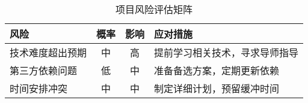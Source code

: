 \begin{table}[H]
\centering
\begin{tabular}{|p{4cm}|c|c|p{5cm}|}
\hline
\textbf{风险} & \textbf{概率} & \textbf{影响} & \textbf{应对措施} \\
\hline
技术难度超出预期 & 中 & 高 & 提前学习相关技术，寻求导师指导 \\
\hline
第三方依赖问题 & 低 & 中 & 准备备选方案，定期更新依赖 \\
\hline
时间安排冲突 & 中 & 中 & 制定详细计划，预留缓冲时间 \\
\hline
\end{tabular}
\caption{项目风险评估矩阵}
\end{table} 